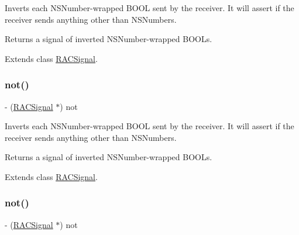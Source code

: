 Inverts each N\+S\+Number-\/wrapped B\+O\+OL sent by the receiver. It will assert if the receiver sends anything other than N\+S\+Numbers.

Returns a signal of inverted N\+S\+Number-\/wrapped B\+O\+O\+Ls. 

Extends class \mbox{\hyperlink{interface_r_a_c_signal_a53de1c418b57ee4c60d20f561db04717}{R\+A\+C\+Signal}}.

\mbox{\label{category_r_a_c_signal_07_operations_08_a53de1c418b57ee4c60d20f561db04717}} 
\subsubsection{\texorpdfstring{not()}{not()}\hspace{0.1cm}{\footnotesize\ttfamily [2/3]}}
{\footnotesize\ttfamily -\/ (\mbox{\hyperlink{interface_r_a_c_signal}{R\+A\+C\+Signal}} $\ast$) not \begin{DoxyParamCaption}{ }\end{DoxyParamCaption}}

Inverts each N\+S\+Number-\/wrapped B\+O\+OL sent by the receiver. It will assert if the receiver sends anything other than N\+S\+Numbers.

Returns a signal of inverted N\+S\+Number-\/wrapped B\+O\+O\+Ls. 

Extends class \mbox{\hyperlink{interface_r_a_c_signal_a53de1c418b57ee4c60d20f561db04717}{R\+A\+C\+Signal}}.

\mbox{\label{category_r_a_c_signal_07_operations_08_a53de1c418b57ee4c60d20f561db04717}} 
\subsubsection{\texorpdfstring{not()}{not()}\hspace{0.1cm}{\footnotesize\ttfamily [3/3]}}
{\footnotesize\ttfamily -\/ (\mbox{\hyperlink{interface_r_a_c_signal}{R\+A\+C\+Signal}} $\ast$) not \begin{DoxyParamCaption}{ }\end{DoxyParamCaption}}

